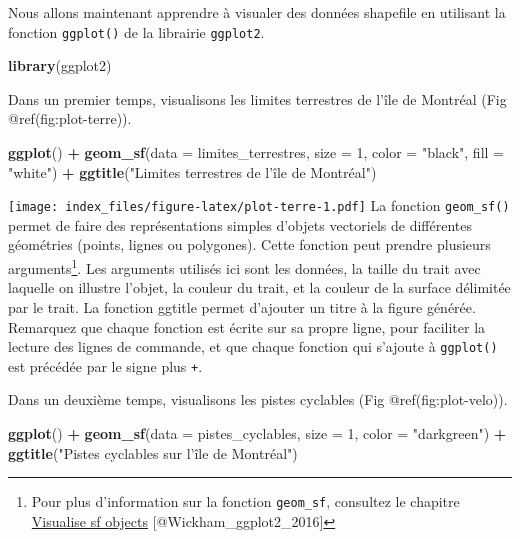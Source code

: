 \documentclass[]{article}
\newenvironment{Shaded}{\begin{snugshade}}{\end{snugshade}}
\newcommand{\KeywordTok}[1]{\textcolor[rgb]{0.13,0.29,0.53}{\textbf{#1}}}
\newcommand{\DataTypeTok}[1]{\textcolor[rgb]{0.13,0.29,0.53}{#1}}
\newcommand{\DecValTok}[1]{\textcolor[rgb]{0.00,0.00,0.81}{#1}}
\newcommand{\StringTok}[1]{\textcolor[rgb]{0.31,0.60,0.02}{#1}}
\newcommand{\OperatorTok}[1]{\textcolor[rgb]{0.81,0.36,0.00}{\textbf{#1}}}
\newcommand{\NormalTok}[1]{#1}
\begin{document}
Nous allons maintenant apprendre à visualer des données shapefile en
utilisant la fonction \texttt{ggplot()} de la librairie
\texttt{ggplot2}.

\begin{Shaded}
\begin{Highlighting}[]
\KeywordTok{library}\NormalTok{(ggplot2)}
\end{Highlighting}
\end{Shaded}

Dans un premier temps, visualisons les limites terrestres de l'île de
Montréal (Fig @ref(fig:plot-terre)).

\begin{Shaded}
\begin{Highlighting}[]
\KeywordTok{ggplot}\NormalTok{() }\OperatorTok{+}
\KeywordTok{geom_sf}\NormalTok{(}\DataTypeTok{data =}\NormalTok{ limites_terrestres, }\DataTypeTok{size =} \DecValTok{1}\NormalTok{, }\DataTypeTok{color =} \StringTok{"black"}\NormalTok{, }\DataTypeTok{fill =} \StringTok{"white"}\NormalTok{) }\OperatorTok{+}
\KeywordTok{ggtitle}\NormalTok{(}\StringTok{"Limites terrestres de l'île de Montréal"}\NormalTok{)}
\end{Highlighting}
\end{Shaded}

\texttt{[image: index\_files/figure-latex/plot-terre-1.pdf]} La fonction
\texttt{geom\_sf()} permet de faire des représentations simples d'objets
vectoriels de différentes géométries (points, lignes ou polygones).
Cette fonction peut prendre plusieurs arguments\footnote{Pour plus
  d'information sur la fonction \texttt{geom\_sf}, consultez le chapitre
  \href{https://ggplot2.tidyverse.org/reference/ggsf.html}{Visualise sf
  objects} {[}@Wickham\_ggplot2\_2016{]}}. Les arguments utilisés ici
sont les données, la taille du trait avec laquelle on illustre l'objet,
la couleur du trait, et la couleur de la surface délimitée par le trait.
La fonction ggtitle permet d'ajouter un titre à la figure générée.
Remarquez que chaque fonction est écrite sur sa propre ligne, pour
faciliter la lecture des lignes de commande, et que chaque fonction qui
s'ajoute à \texttt{ggplot()} est précédée par le signe plus \texttt{+}.

Dans un deuxième temps, visualisons les pistes cyclables (Fig
@ref(fig:plot-velo)).

\begin{Shaded}
\begin{Highlighting}[]
\KeywordTok{ggplot}\NormalTok{() }\OperatorTok{+}
\KeywordTok{geom_sf}\NormalTok{(}\DataTypeTok{data =}\NormalTok{ pistes_cyclables, }\DataTypeTok{size =} \DecValTok{1}\NormalTok{, }\DataTypeTok{color =} \StringTok{"darkgreen"}\NormalTok{) }\OperatorTok{+}
\KeywordTok{ggtitle}\NormalTok{(}\StringTok{"Pistes cyclables sur l'île de Montréal"}\NormalTok{)}
\end{Highlighting}
\end{Shaded}
\end{document}
